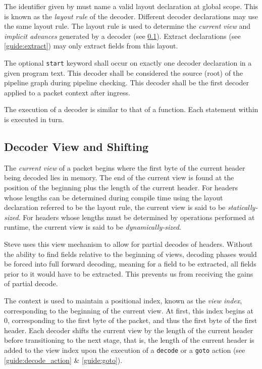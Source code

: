 The identifier given by  must name a valid layout declaration at global scope. This  is known as the \textit{layout rule} of the decoder. Different decoder declarations may use the same layout rule. The layout rule is used to determine the \textit{current view} and \textit{implicit advances} generated by a decoder (see \ref{guide:decoder_view}). Extract declarations (see \ref{guide:extract}) may only extract fields from this layout.

The optional \texttt{start} keyword shall occur on exactly one decoder declaration in a given program text. This decoder shall be considered the source (root) of the pipeline graph during pipeline checking. This decoder shall be the first decoder applied to a packet context after ingress.

The execution of a decoder is similar to that of a function. Each statement within  is executed in turn.

\subsection{Decoder View and Shifting} \label{guide:decoder_view}

The \textit{current view} of a packet begins where the first byte of the current header being decoded lies in memory. The end of the current view is found at the position of the beginning plus the length of the current header. For headers whose lengths can be determined during compile time using the layout declaration referred to be the layout rule, the current view is said to be \textit{statically-sized}. For headers whose lengths must be determined by operations performed at runtime, the current view is said to be \textit{dynamically-sized}.

Steve uses this view mechanism to allow for partial decodes of headers. Without the ability to find fields relative to the beginning of views, decoding phases would be forced into full forward decoding, meaning for a field to be extracted, all fields prior to it would have to be extracted. This prevents us from receiving the gains of partial decode.

The context is used to maintain a positional index, known as the \textit{view index}, corresponding to the beginning of the current view. At first, this index begins at 0, corresponding to the first byte of the packet, and thus the first byte of the first header. Each decoder shifts the current view by the length of the current header before transitioning to the next stage, that is, the length of the current header is added to the view index upon the execution of a \texttt{decode} or a \texttt{goto} action (see \ref{guide:decode_action} \& \ref{guide:goto}).

